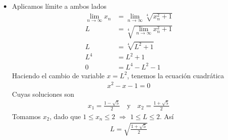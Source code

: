 \documentclass[12pt]{book}
\begin{document}
\begin{itemize}
    \item[\textbf{d)}] Aplicamos límite a ambos lados
    \begin{align*}
        \lim_{n \to \infty} x_n &=  \lim_{n \to \infty} \sqrt[4]{x_n^2 +1 } \\
        L&=  \sqrt[4]{ \lim_{n \to \infty}x_n^2 +1 } \\
        L&= \sqrt[4]{L^2+1} \\
        L^4 &= L^2+1 \\
        0&= L^4 -L^2-1 
    \end{align*}
Haciendo el cambio de variable $x=L^2$, tenemos la ecuación cuadrática
\begin{align*}
    x^2-x-1=0
\end{align*}
Cuyas soluciones son 
\begin{align*}
    x_1= \frac{1-\sqrt{5}}{2} \quad \text{y} \quad x_2 = \frac{1+\sqrt{5}}{2}
\end{align*}
Tomamos $x_2$, dado que $1\leq x_n \leq 2$ $\Longrightarrow$ $1\leq L \leq 2$. Así
\begin{align*}
    L=\sqrt{\frac{1+\sqrt{5}}{2}}
\end{align*}
\end{itemize}
\end{document}
